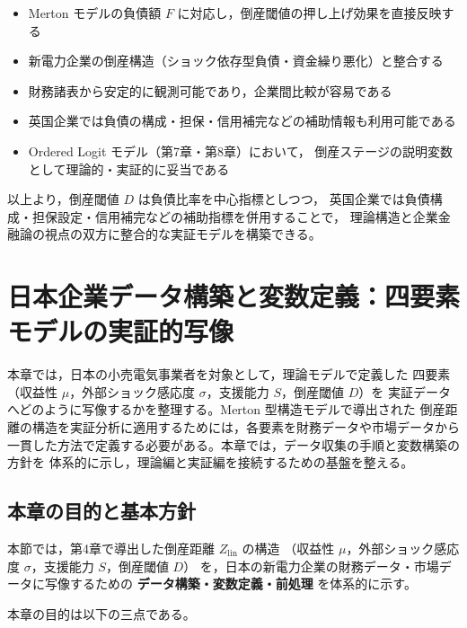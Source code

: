 \begin{itemize}
    \item Merton モデルの負債額 $F$ に対応し，倒産閾値の押し上げ効果を直接反映する
    \item 新電力企業の倒産構造（ショック依存型負債・資金繰り悪化）と整合する
    \item 財務諸表から安定的に観測可能であり，企業間比較が容易である
    \item 英国企業では負債の構成・担保・信用補完などの補助情報も利用可能である
    \item Ordered Logit モデル（第7章・第8章）において，
          倒産ステージの説明変数として理論的・実証的に妥当である
\end{itemize}

以上より，倒産閾値 $D$ は負債比率を中心指標としつつ，
英国企業では負債構成・担保設定・信用補完などの補助指標を併用することで，
理論構造と企業金融論の視点の双方に整合的な実証モデルを構築できる。



\section{日本企業データ構築と変数定義：四要素モデルの実証的写像}
\label{chap:data_construction}

本章では，日本の小売電気事業者を対象として，理論モデルで定義した
四要素（収益性 $\mu$，外部ショック感応度 $\sigma$，支援能力 $S$，倒産閾値 $D$）を
実証データへどのように写像するかを整理する。Merton 型構造モデルで導出された
倒産距離の構造を実証分析に適用するためには，各要素を財務データや市場データから
一貫した方法で定義する必要がある。本章では，データ収集の手順と変数構築の方針を
体系的に示し，理論編と実証編を接続するための基盤を整える。

\subsection{本章の目的と基本方針}

本節では，第4章で導出した倒産距離 $Z_{\text{lin}}$ の構造
（収益性 $\mu$，外部ショック感応度 $\sigma$，支援能力 $S$，倒産閾値 $D$）
を，日本の新電力企業の財務データ・市場データに写像するための
\textbf{データ構築・変数定義・前処理} を体系的に示す。

本章の目的は以下の三点である。


